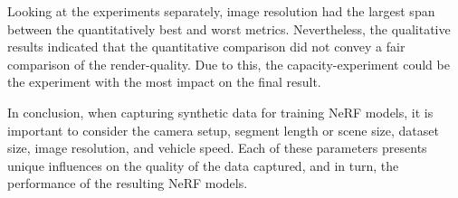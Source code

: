 Looking at the experiments separately, image resolution had the largest span between the quantitatively best and worst metrics. Nevertheless, the qualitative results indicated that the quantitative comparison did not convey a fair comparison of the render-quality. Due to this, the capacity-experiment could be the experiment with the most impact on the final result.

In conclusion, when capturing synthetic data for training NeRF models, it is important to consider the camera setup, segment length or scene size, dataset size, image resolution, and vehicle speed. Each of these parameters presents unique influences on the quality of the data captured, and in turn, the performance of the resulting NeRF models.


\begin{comment}
The critical factors that must be considered when capturing synthetic data for training NeRF models, as inferred from the discussed baseline experiments, encompass camera setup, capacity, number of frames, image size, and vehicle speed. Each of these factors demonstrates a unique impact on the performance of the resulting models.

Camera setup plays a significant role in determining the quality of data captured for NeRF models. The experiments revealed that certain camera arrangements, specifically a setup with two cameras at -10$^{\circ}$ and 10$^{\circ}$ yaw, can result in superior SSIM and LPIPS scores, indicating more visually similar and perceptually pleasing images. This finding can be attributed to the degree of overlap between images captured by each camera in the setup. However, the experiments also highlight that camera arrangements were arbitrary and future research may investigate more realistic setups to better generalize the results.

The capacity, or the length of the road segment covered, also impacts the performance of the NeRF models. Even though longer segments led to lower scores across the metrics, these were still selected as the baseline to ensure a diverse range of environmental exposure for the model. It was noticed that the quality of renders deteriorated, especially in terms of increased blur, as segment length increased. Hence, the capacity of data has implications on the clarity and diversity of the training set, which could potentially influence the robustness of the model to diverse scenarios.

The number of frames in the dataset is another crucial factor. An optimal balance between the number of images and the image resolution is important for efficient training. In the experiments, a dataset with 225 images, each with a resolution of $600 \times 450$, covered approximately all of the input pixels by the end of training. However, a dataset with too many or too few images could result in either underutilization or overutilization of the pixels during training. Additionally, a decrease in PSNR with a drop in the number of frames points to the role of variety in the dataset.


\end{comment}
